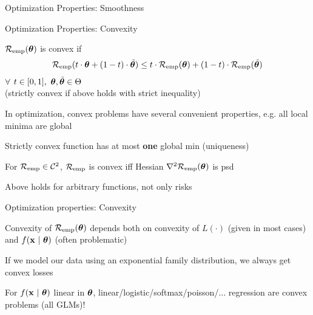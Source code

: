 \documentclass[11pt,compress,t,notes=noshow, xcolor=table]{beamer}
\begin{document}
\begin{frame}{Optimization Properties: Smoothness}

\end{frame}


\begin{framei}[sep=L]{Optimization Properties: Convexity}

\item $\mathcal{R}_{\text{emp}}(\bm{\theta})$ is convex if
$$
\mathcal{R}_{\text{emp}}(t \cdot \bm{\theta} + (1 - t) \cdot \tilde {\bm{\theta}}) \le t \cdot
\mathcal{R}_{\text{emp}}(\bm{\theta}) + (1 - t) \cdot \mathcal{R}_{\text{emp}}(\tilde {\bm{\theta}} )
$$
$\forall$ $t \in [0, 1], ~\bm{\theta}, \tilde {\bm{\theta}} \in \Theta$\\
(strictly convex if above holds with strict inequality)

\item In optimization, convex problems have several convenient properties, e.g. all local minima are global 
\item Strictly convex function has at most \textbf{one} global min (uniqueness)

\item For $\mathcal{R}_{\text{emp}} \in \mathcal{C}^{2}$, $\mathcal{R}_{\text{emp}}$ is convex iff Hessian $\nabla^2 \mathcal{R}_{\text{emp}}(\bm{\theta})$ is psd

\item Above holds for arbitrary functions, not only risks

\end{framei}


\begin{frame}{Optimization properties: Convexity}

\begin{itemizeL}
\item Convexity of $\mathcal{R}_{\text{emp}}(\bm{\theta})$ depends both on convexity of $L(\cdot)$ (given in most cases) and $f(\mathbf{x} ~|~ \bm{\theta})$ (often problematic)
\item If we model our data using an exponential family distribution, we always get convex losses 
\item For $f(\mathbf{x} ~|~ \bm{\theta})$ linear in $\bm{\theta}$, linear/logistic/softmax/poisson/$\ldots$ regression are convex problems (all GLMs)! 
\end{itemizeL} 

\vfill

{
  }%

\end{frame}
\end{document}
